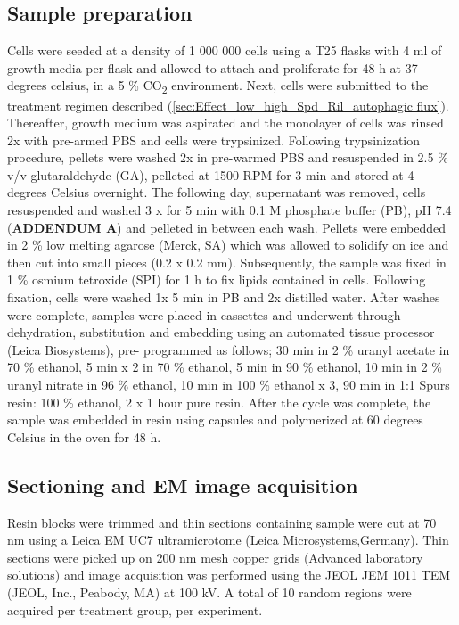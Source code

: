\subsection{Sample preparation}
Cells were seeded at a density of 1 000 000 cells using a T25 flasks with 4 ml of growth media per flask and allowed to attach and proliferate for 48 h at 37 degrees  celsius, in a 5 \% CO\textsubscript{2} environment. Next, cells were submitted to the treatment regimen described (\cref{sec:Effect_low_high_Spd_Ril_autophagic flux}). Thereafter, growth medium was aspirated and the monolayer of cells was rinsed 2x with pre-armed PBS and cells were trypsinized. Following trypsinization procedure, pellets were washed 2x in pre-warmed PBS and resuspended in 2.5 \% v/v glutaraldehyde (GA), pelleted at 1500 RPM for 3 min and stored at 4 degrees Celsius overnight. The following day, supernatant was removed, cells resuspended and washed 3 x for 5 min with 0.1 M phosphate buffer (PB), pH 7.4 (\textbf{ADDENDUM A}) and pelleted in between each wash. Pellets were embedded in 2 \% low melting agarose (Merck, SA) which was allowed to solidify on ice and then cut into small pieces (0.2 x 0.2 mm). Subsequently, the sample was fixed in 1 \% osmium tetroxide (SPI) for 1 h to fix lipids contained in cells. Following fixation, cells were washed 1x 5 min in PB and 2x distilled water. After washes were complete, samples were placed in cassettes and underwent through dehydration, substitution and embedding using an automated tissue processor (Leica Biosystems), pre- programmed as follows; 30 min in 2 \% uranyl acetate in 70 \% ethanol, 5 min x 2 in 70 \% ethanol, 5 min in 90 \% ethanol, 10 min in 2 \% uranyl nitrate in 96 \% ethanol, 10 min in 100 \% ethanol x 3, 90 min in 1:1 Spurs resin: 100 \% ethanol, 2 x 1 hour pure resin. After the cycle was complete, the sample was embedded in resin using capsules and polymerized at 60 degrees Celsius in the oven for 48 h.

\subsection{Sectioning and EM image acquisition}
Resin blocks were trimmed and thin sections containing sample were cut at 70 nm using a Leica EM UC7 ultramicrotome (Leica Microsystems,Germany). Thin sections were picked up on 200 nm mesh copper grids (Advanced laboratory solutions) and image acquisition was performed using the JEOL JEM 1011 TEM (JEOL, Inc., Peabody, MA) at 100 kV. A total of 10 random regions were acquired per treatment group, per experiment.  

